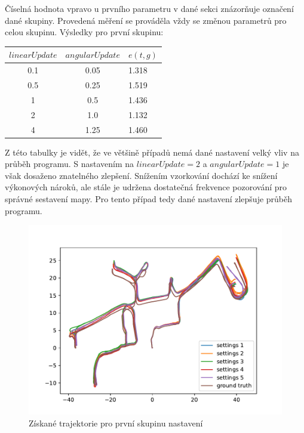 \documentclass[12pt]{report}
\begin{document}
Číselná hodnota vpravo u prvního parametru v dané sekci znázorňuje označení dané skupiny. Provedená měření se prováděla vždy se změnou parametrů pro celou skupinu.
Výsledky pro první skupinu:
\begin{center}
	\begin{tabular}{cc|p{1.5cm}}
		\bfseries $linearUpdate$  & \bfseries $angularUpdate$ & $e(t,g)$ \\ [2mm]
		\hline
		0.1 & 0.05 & 1.318 \\
		0.5 & 0.25 & 1.519 \\ 
		1 & 0.5 & 1.436 \\ 
		2 & 1.0 & 1.132 \\
		4 & 1.25 & 1.460\\
	\end{tabular}
\end{center}
Z této tabulky je vidět, že ve většině případů nemá dané nastavení velký vliv na průběh programu. S nastavením na $linearUpdate=2$ a $angularUpdate=1$ je však dosaženo znatelného zlepšení. Snížením vzorkování dochází ke snížení výkonových nároků, ale stále je udržena dostatečná frekvence pozorování pro správné sestavení mapy. Pro tento případ tedy dané nastavení zlepšuje průběh programu.\\

\begin{figure}[!ht]
	\begin{center}
		\includegraphics[width=0.67\columnwidth]{imgs/gmapping1.pdf}
	\end{center}
	\caption{Získané trajektorie pro první skupinu nastavení}
	\label{fig:gmapping1}
\end{figure}
\end{document}
